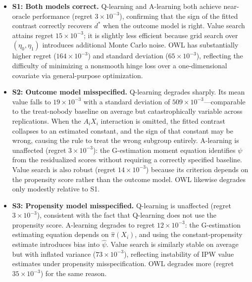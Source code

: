 \documentclass[master.tex]{subfiles}
\begin{document}
\begin{itemize}

  \item \textbf{S1: Both models correct.}  Q-learning and A-learning both
    achieve near-oracle performance (regret $3\times10^{-3}$), confirming
    that the sign of the fitted contrast correctly recovers $d^\ast$ when
    the outcome model is right. Value search attains regret $15\times10^{-3}$;
    it is slightly less efficient because grid search over $(\eta_0,\eta_1)$
    introduces additional Monte Carlo noise. OWL has substantially higher
    regret ($164\times10^{-3}$) and standard deviation ($65\times10^{-3}$),
    reflecting the difficulty of minimizing a nonsmooth hinge loss over a
    one-dimensional covariate via general-purpose optimization.

  \item \textbf{S2: Outcome model misspecified.}  Q-learning degrades
    sharply. Its mean value falls to $19\times10^{-3}$ with a standard
    deviation of $509\times10^{-3}$---comparable to the treat-nobody baseline
    on average but catastrophically variable across replications. When the
    $A_i X_i$ interaction is omitted, the fitted contrast collapses to an
    estimated constant, and the sign of that constant may be wrong, causing
    the rule to treat the wrong subgroup entirely. A-learning is unaffected
    (regret $3\times10^{-3}$): the G-estimation moment equation identifies
    $\psi$ from the residualized scores without requiring a correctly
    specified baseline. Value search is also robust (regret $14\times10^{-3}$)
    because its criterion depends on the propensity score rather than the
    outcome model. OWL likewise degrades only modestly relative to S1.

  \item \textbf{S3: Propensity model misspecified.}  Q-learning is unaffected
    (regret $3\times10^{-3}$), consistent with the fact that Q-learning
    does not use the propensity score. A-learning degrades to regret
    $12\times10^{-3}$: the G-estimation estimating equation depends on
    $\hat\pi(X_i)$, and using the constant-propensity estimate introduces
    bias into $\hat\psi$. Value search is similarly stable on average but
    with inflated variance ($73\times10^{-3}$), reflecting instability of
    IPW value estimates under propensity misspecification. OWL degrades
    more (regret $35\times10^{-3}$) for the same reason.

\end{itemize}
\end{document}
